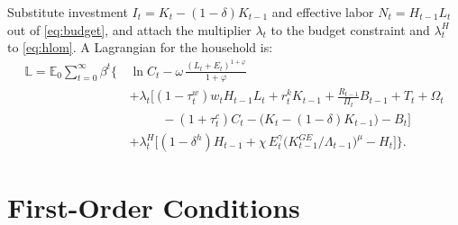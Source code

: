 \documentclass[11pt]{article}
\begin{document}
Substitute investment $I_t = K_t - (1-\delta)K_{t-1}$ and effective labor
$N_t = H_{t-1}L_t$ out of \eqref{eq:budget}, and attach the multiplier $\lambda_t$
to the budget constraint and $\lambda_t^{H}$ to \eqref{eq:hlom}. A Lagrangian for
the household is:
\begin{equation*}
\begin{aligned}
    \mathbb{L} = \mathbb{E}_0 \sum_{t=0}^{\infty} \beta^{t} \Big\{\,
    & \ln C_t - \omega\,\frac{\left(L_t + E_t\right)^{1+\varphi}}{1+\varphi} \\
    & + \lambda_t \Big[\left(1-\tau_t^{w}\right) w_t H_{t-1} L_t
      + r_t^{k} K_{t-1} + \tfrac{R_{t-1}}{\Pi_t} B_{t-1} + T_t + \Omega_t \\
    & \qquad\;\; - \left(1+\tau_t^{c}\right) C_t
      - \big(K_t - (1-\delta) K_{t-1}\big) - B_t \Big] \\
    & + \lambda_t^{H} \Big[\left(1-\delta^{h}\right) H_{t-1}
      + \chi\, E_t^{\gamma} \big(K_{t-1}^{GE}/\Lambda_{t-1}\big)^{\mu}
      - H_t \Big] \Big\}.
\end{aligned}
\end{equation*}

\section{First-Order Conditions}
\end{document}
